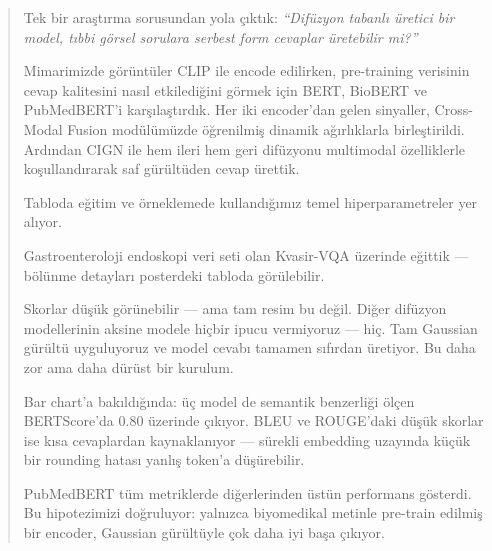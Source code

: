 \documentclass[12pt, a4paper]{article}
\begin{document}
\begin{quote}
\large

Tek bir araştırma sorusundan yola çıktık:
\textit{``Difüzyon tabanlı üretici bir model, tıbbi görsel sorulara serbest form cevaplar üretebilir mi?''}

Mimarimizde görüntüler CLIP ile encode edilirken, pre-training verisinin cevap kalitesini nasıl etkilediğini görmek için BERT, BioBERT ve PubMedBERT'i karşılaştırdık.
Her iki encoder'dan gelen sinyaller, Cross-Modal Fusion modülümüzde öğrenilmiş dinamik ağırlıklarla birleştirildi.
Ardından CIGN ile hem ileri hem geri difüzyonu multimodal özelliklerle koşullandırarak saf gürültüden cevap ürettik.

Tabloda eğitim ve örneklemede kullandığımız temel hiperparametreler yer alıyor.

Gastroenteroloji endoskopi veri seti olan Kvasir-VQA üzerinde eğittik — bölünme detayları posterdeki tabloda görülebilir.

Skorlar düşük görünebilir — ama tam resim bu değil.
Diğer difüzyon modellerinin aksine modele hiçbir ipucu vermiyoruz — hiç.
Tam Gaussian gürültü uyguluyoruz ve model cevabı tamamen sıfırdan üretiyor.
Bu daha zor ama daha dürüst bir kurulum.

Bar chart'a bakıldığında: üç model de semantik benzerliği ölçen BERTScore'da 0.80 üzerinde çıkıyor.
BLEU ve ROUGE'daki düşük skorlar ise kısa cevaplardan kaynaklanıyor — sürekli embedding uzayında küçük bir rounding hatası yanlış token'a düşürebilir.

PubMedBERT tüm metriklerde diğerlerinden üstün performans gösterdi.
Bu hipotezimizi doğruluyor: yalnızca biyomedikal metinle pre-train edilmiş bir encoder, Gaussian gürültüyle çok daha iyi başa çıkıyor.

\end{quote}
\end{document}
